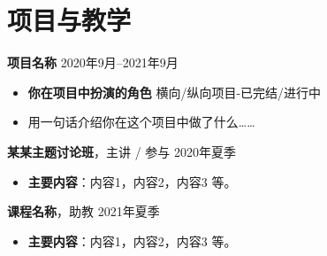 \documentclass[11pt]{article}
\newlength{\iconwidth}
\begin{document}
    \begin{minipage}[t]{\textwidth}
    \section[项目与教学]{\makebox[\iconwidth][c]{\color{primary_color}{\Large $\bullet$}}\quad 项目与教学}
    
    {\large \textbf{项目名称}} \hfill 2020年9月--2021年9月
    \begin{itemize}
        \item \textbf{你在项目中扮演的角色} \hfill 横向/纵向项目-已完结/进行中
        \item 用一句话介绍你在这个项目中做了什么……
    \end{itemize}

    \vspace{0.5em}
    {\large \textbf{某某主题讨论班}}，主讲 / 参与 \hfill 2020年夏季
    \begin{itemize}
        \item \textbf{主要内容}：内容1，内容2，内容3 等。
    \end{itemize}

    \vspace{0.5em}
    {\large \textbf{课程名称}}，助教 \hfill 2021年夏季
    \begin{itemize}
        \item \textbf{主要内容}：内容1，内容2，内容3 等。
    \end{itemize}
    
    \vspace{1.2em}
    \end{minipage}
    
\end{document}
